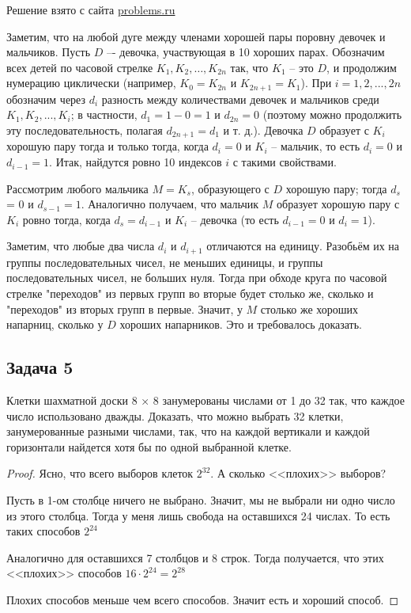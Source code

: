 Решение взято с сайта \href{https://problems.ru/view_problem_details_new.php?id=65713}{problems.ru}

Заметим, что на любой дуге между членами хорошей пары поровну девочек и мальчиков.
Пусть $D$ –- девочка, участвующая в 10 хороших парах. Обозначим всех детей по часовой стрелке $K_1, K_2, \ldots, K_{2n}$ так, что $K_1$ – это $D$, и продолжим нумерацию циклически (например,  $K_0 = K_{2n}$  и  $K_{2n+1} = K_1$).  При $i = 1, 2, ..., 2n$  обозначим через $d_i$ разность между количествами девочек и мальчиков среди $K_1, K_2, ..., K_i$; в частности, $d_1 = 1 - 0 = 1$ и  $d_{2n} = 0$ (поэтому можно продолжить эту последовательность, полагая  $d_{2n+1} = d_1$ и т. д.). Девочка $D$ образует с $K_i$ хорошую пару тогда и только тогда, когда  $d_i = 0$  и  $K_i$ – мальчик, то есть  $d_i = 0$  и  $d_{i-1} = 1$.  Итак, найдутся ровно 10 индексов $i$ с такими свойствами.

Рассмотрим любого мальчика  $M = K_s$,  образующего с $D$ хорошую пару; тогда  $d_s$ = 0  и  $d_{s-1} = 1$.  Аналогично получаем, что мальчик $M$ образует хорошую пару с $K_i$ ровно тогда, когда $d_s = d_{i-1}$ и $K_i$ – девочка (то есть  $d_{i-1} = 0$ и $d_i = 1$).

Заметим, что любые два числа $d_i$ и $d_{i+1}$ отличаются на единицу. Разобьём их на группы последовательных чисел, не меньших единицы, и группы последовательных чисел, не больших нуля. Тогда при обходе круга по часовой стрелке "переходов" из первых групп во вторые будет столько же, сколько и "переходов" из вторых групп в первые. Значит, у $M$ столько же хороших напарниц, сколько у $D$ хороших напарников. Это и требовалось доказать.

\subsection{Задача 5}

Клетки шахматной доски 8 × 8 занумерованы числами от 1 до 32 так, что каждое число использовано дважды. Доказать, что можно выбрать 32 клетки, занумерованные
разными числами, так, что на каждой вертикали и каждой горизонтали найдется хотя
бы по одной выбранной клетке.

\begin{proof}
Ясно, что всего выборов клеток $2^{32}$. А сколько <<плохих>> выборов? 

Пусть в 1-ом столбце ничего не выбрано. Значит, мы не выбрали ни одно число из этого столбца. Тогда у меня лишь свобода на оставшихся 24 числах. То есть таких способов $2^{24}$

Аналогично для оставшихся 7 столбцов и 8 строк. Тогда получается, что этих <<плохих>> способов $16 \cdot 2^{24} = 2^{28}$

Плохих способов меньше чем всего способов. Значит есть и хороший способ.
\end{proof}


